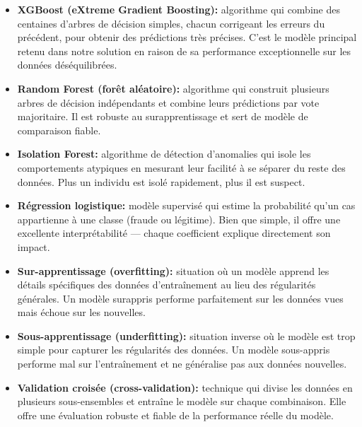 \documentclass[a4paper, oneside, 12pt]{book}
\begin{document}
\begin{itemize}[label=\textbullet]

    \item \textbf{XGBoost (eXtreme Gradient Boosting):} algorithme qui combine 
    des centaines d'arbres de décision simples, chacun corrigeant les erreurs du 
    précédent, pour obtenir des prédictions très précises. C'est le modèle principal 
    retenu dans notre solution en raison de sa performance exceptionnelle sur 
    les données déséquilibrées.

    \item \textbf{Random Forest (forêt aléatoire):} algorithme qui construit 
    plusieurs arbres de décision indépendants et combine leurs prédictions par vote 
    majoritaire. Il est robuste au surapprentissage et sert de modèle de comparaison 
    fiable.

    \item \textbf{Isolation Forest:} algorithme de détection d'anomalies qui isole 
    les comportements atypiques en mesurant leur facilité à se séparer du reste des 
    données. Plus un individu est isolé rapidement, plus il est suspect.

    \item \textbf{Régression logistique:} modèle supervisé qui estime la probabilité 
    qu'un cas appartienne à une classe (fraude ou légitime). Bien que simple, il 
    offre une excellente interprétabilité — chaque coefficient explique directement 
    son impact.

    \item \textbf{Sur-apprentissage (overfitting):} situation où un modèle apprend 
    les détails spécifiques des données d'entraînement au lieu des régularités 
    générales. Un modèle surappris performe parfaitement sur les données vues mais 
    échoue sur les nouvelles.

    \item \textbf{Sous-apprentissage (underfitting):} situation inverse où le modèle 
    est trop simple pour capturer les régularités des données. Un modèle 
    sous-appris performe mal sur l'entraînement et ne généralise pas aux données 
    nouvelles.

    \item \textbf{Validation croisée (cross-validation):} technique qui divise les 
    données en plusieurs sous-ensembles et entraîne le modèle sur chaque combinaison. 
    Elle offre une évaluation robuste et fiable de la performance réelle du modèle.


\end{itemize}
\end{document}
